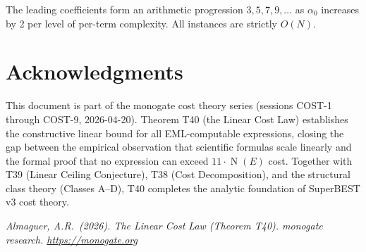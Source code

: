 \documentclass[12pt,a4paper]{article}
\theoremstyle{definition}
\newcommand{\NOp}{\operatorname{N}}
\begin{document}
The leading coefficients form an arithmetic progression $3, 5, 7, 9, \ldots$
as $\alpha_0$ increases by 2 per level of per-term complexity.  All instances
are strictly $O(N)$.

\section*{Acknowledgments}

This document is part of the monogate cost theory series
(sessions COST-1 through COST-9, 2026-04-20).
Theorem T40 (the Linear Cost Law) establishes the constructive linear bound
for all EML-computable expressions, closing the gap between the empirical
observation that scientific formulas scale linearly and the formal proof
that no expression can exceed $11 \cdot \NOp(E)$ cost.
Together with T39 (Linear Ceiling Conjecture), T38 (Cost Decomposition), and
the structural class theory (Classes A--D), T40 completes the analytic
foundation of SuperBEST v3 cost theory.

\bigskip
\noindent\textit{Almaguer, A.R.\ (2026).
The Linear Cost Law (Theorem T40).
monogate research. \url{https://monogate.org}}
\end{document}
